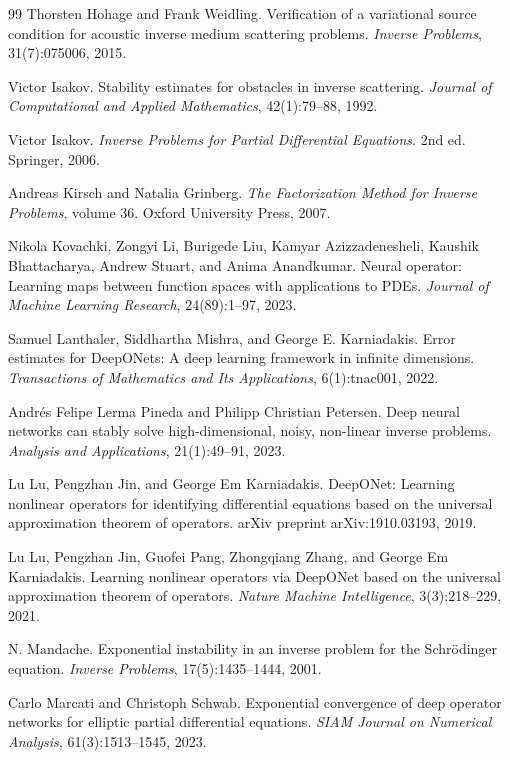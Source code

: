 \documentclass{article}
\numberwithin{equation}{section}
\theoremstyle{plain}
\begin{document}
\begin{thebibliography}{99}
		 Thorsten Hohage and Frank Weidling. Verification of a variational source condition for acoustic inverse medium scattering problems. \textit{Inverse Problems}, 31(7):075006, 2015.
		
		 Victor Isakov. Stability estimates for obstacles in inverse scattering. \textit{Journal of Computational and Applied Mathematics}, 42(1):79--88, 1992.
		
		 Victor Isakov. \textit{Inverse Problems for Partial Differential Equations}. 2nd ed. Springer, 2006.
		
		 Andreas Kirsch and Natalia Grinberg. \textit{The Factorization Method for Inverse Problems}, volume 36. Oxford University Press, 2007.
		
		 Nikola Kovachki, Zongyi Li, Burigede Liu, Kamyar Azizzadenesheli, Kaushik Bhattacharya, Andrew Stuart, and Anima Anandkumar. Neural operator: Learning maps between function spaces with applications to PDEs. \textit{Journal of Machine Learning Research}, 24(89):1--97, 2023.
		
		 Samuel Lanthaler, Siddhartha Mishra, and George E. Karniadakis. Error estimates for DeepONets: A deep learning framework in infinite dimensions. \textit{Transactions of Mathematics and Its Applications}, 6(1):tnac001, 2022.
		
		 Andr\'es Felipe Lerma Pineda and Philipp Christian Petersen. Deep neural networks can stably solve high-dimensional, noisy, non-linear inverse problems.
		\textit{Analysis and Applications}, 21(1):49--91, 2023.
		
		 Lu Lu, Pengzhan Jin, and George Em Karniadakis. DeepONet: Learning nonlinear operators for identifying differential equations based on the universal approximation theorem of operators. arXiv preprint arXiv:1910.03193, 2019.
		
		 Lu Lu, Pengzhan Jin, Guofei Pang, Zhongqiang Zhang, and George Em Karniadakis. Learning nonlinear operators via DeepONet based on the universal approximation theorem of operators. \textit{Nature Machine Intelligence}, 3(3):218--229, 2021.
		
		 N. Mandache. Exponential instability in an inverse problem for the Schr\"odinger equation. \textit{Inverse Problems}, 17(5):1435--1444, 2001.
		
		 Carlo Marcati and Christoph Schwab. Exponential convergence of deep operator networks for elliptic partial differential equations. \textit{SIAM Journal on Numerical Analysis}, 61(3):1513--1545, 2023.
		

\end{thebibliography}
\end{document}

